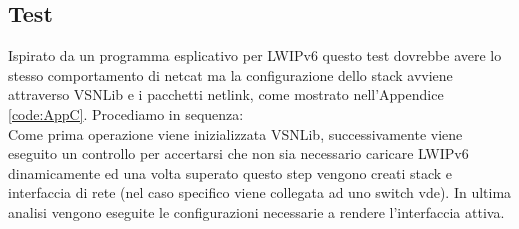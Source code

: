 \subsection{Test}
Ispirato da un programma esplicativo per LWIPv6 questo test dovrebbe avere lo stesso comportamento di netcat ma la configurazione dello stack avviene attraverso VSNLib e i pacchetti netlink, come mostrato nell'Appendice \ref{code:AppC}.
Procediamo in sequenza:\\
Come prima operazione viene inizializzata VSNLib, successivamente viene eseguito un controllo per accertarsi che non sia necessario caricare LWIPv6 dinamicamente ed una volta superato questo step vengono creati stack e interfaccia di rete (nel caso specifico viene collegata ad uno switch vde). In ultima analisi vengono eseguite le configurazioni necessarie a rendere l'interfaccia attiva.
